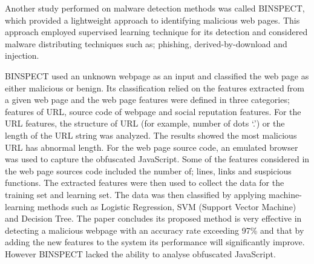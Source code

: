 Another study performed on malware detection methods was called BINSPECT, which
provided a lightweight approach to identifying malicious web pages. This
approach employed supervised learning technique for its detection and
considered malware distributing techniques such as; phishing,
derived-by-download and injection\cite{eshete2012binspect}.

BINSPECT used an unknown webpage as an input and classified the web page as
either malicious or benign. Its classification relied on the features extracted
from a given web page and the web page features were defined in three
categories; features of URL, source code of webpage and social reputation
features.  For the URL features, the structure of URL (for example, number of
dots ‘.’) or the length of the URL string was analyzed. The results showed the
most malicious URL has abnormal length. For the web page source code, an
emulated browser was used to capture the obfuscated JavaScript. Some of the
features considered in the web page sources code included the number of; lines,
links and suspicious functions. The extracted features were then used to
collect the data for the training set and learning set. The data was then
classified by applying machine-learning methods such as Logistic Regression,
SVM (Support Vector Machine) and Decision Tree\cite{eshete2012binspect}.  The
paper concludes its proposed method is very effective in detecting a malicious
webpage with an accuracy rate exceeding 97\% and that by adding the new
features to the system its performance will significantly improve. However
BINSPECT lacked the ability to analyse obfuscated
JavaScript\cite{eshete2012binspect}. 
